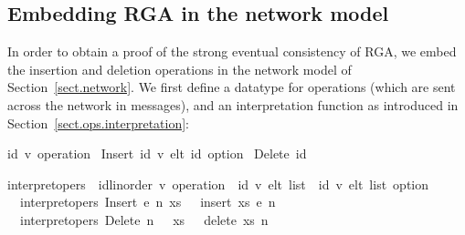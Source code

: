 \subsection{Embedding RGA in the network model}

In order to obtain a proof of the strong eventual consistency of RGA, we embed the insertion and deletion operations in the network model of Section~\ref{sect.network}.
We first define a datatype for operations (which are sent across the network in messages), and an interpretation function as introduced in Section~\ref{sect.ops.interpretation}:
\begin{isabelle}
 {\isacharparenleft}{\isacharprime}id{\isacharcomma}\ {\isacharprime}v{\isacharparenright}\ operation\ {\isacharequal} Insert\ {\isachardoublequoteopen}{\isacharparenleft}{\isacharprime}id{\isacharcomma}\ {\isacharprime}v{\isacharparenright}\ elt{\isachardoublequoteclose}\ {\isachardoublequoteopen}{\isacharprime}id\ option{\isachardoublequoteclose}\ {\isacharbar} Delete\ {\isachardoublequoteopen}{\isacharprime}id{\isachardoublequoteclose}
\end{isabelle}
\begin{isabelle}
 interpret{\isacharunderscore}opers\ {\isacharcolon}{\isacharcolon}\ {\isachardoublequoteopen}{\isacharparenleft}{\isacharprime}id{\isacharcolon}{\isacharcolon}linorder{\isacharcomma}\ {\isacharprime}v{\isacharparenright}\ operation\ {\isasymRightarrow}\ {\isacharparenleft}{\isacharprime}id{\isacharcomma}\ {\isacharprime}v{\isacharparenright}\ elt\ list\ {\isasymRightarrow}\ {\isacharparenleft}{\isacharprime}id{\isacharcomma}\ {\isacharprime}v{\isacharparenright}\ elt\ list\ option{\isachardoublequoteclose}\ \isanewline
\ \ {\isachardoublequoteopen}interpret{\isacharunderscore}opers\ {\isacharparenleft}Insert\ e\ n{\isacharparenright}\ xs\ \ {\isacharequal}\ insert\ xs\ e\ n{\isachardoublequoteclose}\ {\isacharbar}\isanewline
\ \ {\isachardoublequoteopen}interpret{\isacharunderscore}opers\ {\isacharparenleft}Delete\ n{\isacharparenright}\ \ \ xs\ \ {\isacharequal}\ delete\ xs\ n{\isachardoublequoteclose}
\end{isabelle}

